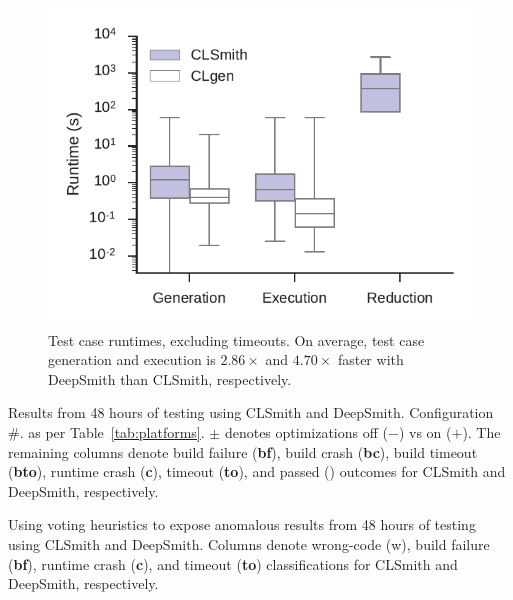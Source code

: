 \begin{figure}
	\centering %
	\includegraphics[width=\columnwidth]{build/img/runtimes}%
	\caption{%
		Test case runtimes, excluding timeouts. On average, test case generation and execution is $2.86\times$ and $4.70\times$ faster with DeepSmith than CLSmith, respectively. %
	}%
	\label{fig:runtimes} %
\end{figure}


\begin{table}
	\scriptsize %
	\centering %
	
	\caption{Results from 48 hours of testing using CLSmith and DeepSmith. Configuration \#. as per Table~\ref{tab:platforms}. $\pm$ denotes optimizations off ($-$) vs on ($+$). The remaining columns denote build failure (\textbf{bf}), build crash (\textbf{bc}), build timeout (\textbf{bto}), runtime crash (\textbf{c}), timeout (\textbf{to}), and passed (\textbf{\cmark}) outcomes for CLSmith and DeepSmith, respectively.}
	\label{tab:outcomes}
\end{table}

\begin{table}
	\scriptsize %
	\centering %
	
	\caption{Using voting heuristics to expose anomalous results from 48 hours of testing using CLSmith and DeepSmith. Columns denote wrong-code (w), build failure (\textbf{bf}), runtime crash (\textbf{c}), and timeout (\textbf{to}) classifications for CLSmith and DeepSmith, respectively.}
	\label{tab:classifications}
\end{table}


